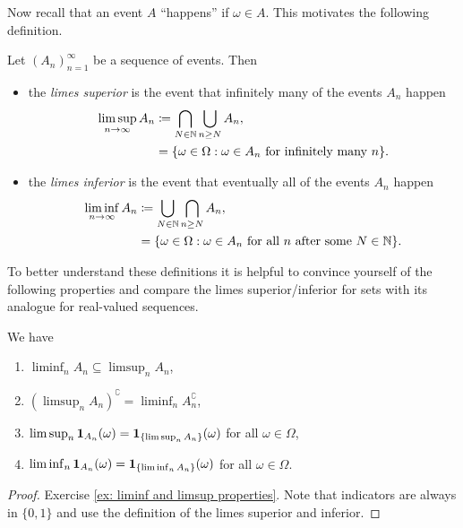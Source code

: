 Now recall that an event \(A\) ``happens'' if \(\omega \in A\). This
motivates the following definition.

\begin{definition}
    Let \((A_n)_{n=1}^\infty\) be a sequence of events. Then
    \begin{itemize}
        \item 
        the \emph{limes superior}
        is the event that infinitely many of the events \(A_n\) happen
        \[\begin{aligned}
            \limsup_{n\to\infty} A_n 
            &\coloneq \bigcap_{N\in \mathbb{N}} \bigcup_{n \ge N} A_n,
            \\
            &= \{\omega \in \Omega : \omega \in A_n \text{ for infinitely many } n\}.
        \end{aligned}
        \]
        
        \item
        the \emph{limes inferior}
        is the event that eventually all of the events \(A_n\) happen
        \[\begin{aligned}
            \liminf_{n\to\infty} A_n 
            &\coloneq \bigcup_{N\in \mathbb{N}} \bigcap_{n \ge N} A_n,
            \\
            &= \{\omega \in \Omega : \omega \in A_n \text{ for all \(n\) after some } N\in \mathbb{N}\}.
        \end{aligned}
        \]
    \end{itemize}
\end{definition}

To better understand these definitions it is helpful to convince yourself of the
following properties and compare the limes superior/inferior for sets with
its analogue for real-valued sequences.

\begin{lemma}
    \label{lem: liminf and limsup properties}
    We have
    \begin{enumerate}[label=(\roman*)]
        \item \(\liminf_n A_n \subseteq \limsup_n A_n\),
        \item \((\limsup_n A_n)^\complement = \liminf_n A_n^\complement\),
        \item \(\limsup_n \ind{A_n}(\omega) = \ind*{\limsup_n A_n}(\omega)\) for all \(\omega \in \Omega\),
        \item \(\liminf_n \ind{A_n}(\omega) = \ind*{\liminf_n A_n}(\omega)\) for all \(\omega \in \Omega\).
    \end{enumerate}
\end{lemma}
\begin{proof}
    Exercise \ref{ex: liminf and limsup properties}. Note that indicators are always in \(\{0,1\}\)
    and use the definition of the limes superior and inferior.
\end{proof}

